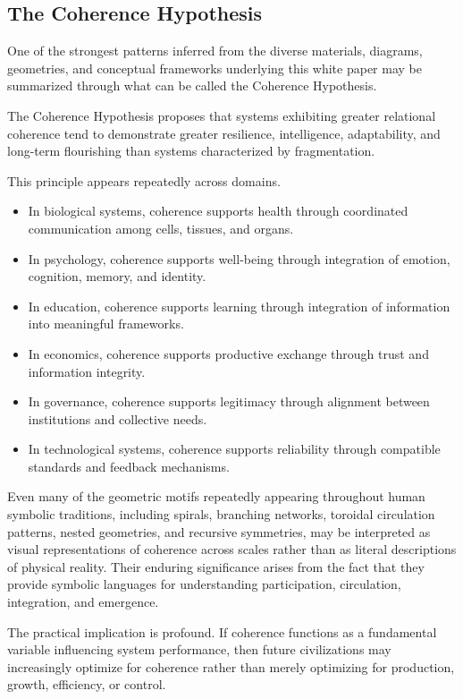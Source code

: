 \documentclass[12pt]{article}
\begin{document}
\subsection{The Coherence Hypothesis}

One of the strongest patterns inferred from the diverse materials, diagrams, geometries, and conceptual frameworks underlying this white paper may be summarized through what can be called the Coherence Hypothesis.

The Coherence Hypothesis proposes that systems exhibiting greater relational coherence tend to demonstrate greater resilience, intelligence, adaptability, and long-term flourishing than systems characterized by fragmentation.

This principle appears repeatedly across domains.

\begin{itemize}
  \item In biological systems, coherence supports health through coordinated communication among cells, tissues, and organs.
  \item In psychology, coherence supports well-being through integration of emotion, cognition, memory, and identity.
  \item In education, coherence supports learning through integration of information into meaningful frameworks.
  \item In economics, coherence supports productive exchange through trust and information integrity.
  \item In governance, coherence supports legitimacy through alignment between institutions and collective needs.
  \item In technological systems, coherence supports reliability through compatible standards and feedback mechanisms.
\end{itemize}

Even many of the geometric motifs repeatedly appearing throughout human symbolic traditions, including spirals, branching networks, toroidal circulation patterns, nested geometries, and recursive symmetries, may be interpreted as visual representations of coherence across scales rather than as literal descriptions of physical reality. Their enduring significance arises from the fact that they provide symbolic languages for understanding participation, circulation, integration, and emergence.

The practical implication is profound. If coherence functions as a fundamental variable influencing system performance, then future civilizations may increasingly optimize for coherence rather than merely optimizing for production, growth, efficiency, or control.
\end{document}
